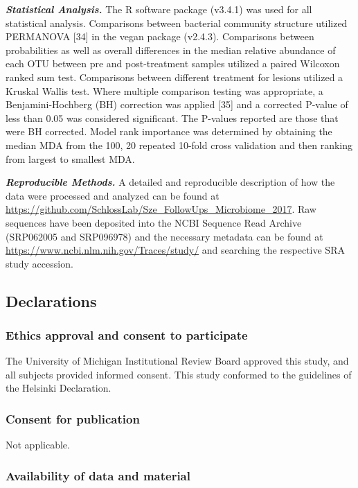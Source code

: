 \documentclass[12pt,]{article}
\begin{document}
\textbf{\emph{Statistical Analysis.}} The R software package (v3.4.1)
was used for all statistical analysis. Comparisons between bacterial
community structure utilized PERMANOVA {[}34{]} in the vegan package
(v2.4.3). Comparisons between probabilities as well as overall
differences in the median relative abundance of each OTU between pre and
post-treatment samples utilized a paired Wilcoxon ranked sum test.
Comparisons between different treatment for lesions utilized a Kruskal
Wallis test. Where multiple comparison testing was appropriate, a
Benjamini-Hochberg (BH) correction was applied {[}35{]} and a corrected
P-value of less than 0.05 was considered significant. The P-values
reported are those that were BH corrected. Model rank importance was
determined by obtaining the median MDA from the 100, 20 repeated 10-fold
cross validation and then ranking from largest to smallest MDA.

\textbf{\emph{Reproducible Methods.}} A detailed and reproducible
description of how the data were processed and analyzed can be found at
\url{https://github.com/SchlossLab/Sze_FollowUps_Microbiome_2017}. Raw
sequences have been deposited into the NCBI Sequence Read Archive
(SRP062005 and SRP096978) and the necessary metadata can be found at
\url{https://www.ncbi.nlm.nih.gov/Traces/study/} and searching the
respective SRA study accession.

\newpage

\subsection{Declarations}\label{declarations}

\subsubsection{Ethics approval and consent to
participate}\label{ethics-approval-and-consent-to-participate}

The University of Michigan Institutional Review Board approved this
study, and all subjects provided informed consent. This study conformed
to the guidelines of the Helsinki Declaration.

\subsubsection{Consent for publication}\label{consent-for-publication}

Not applicable.

\subsubsection{Availability of data and
material}\label{availability-of-data-and-material}
\end{document}
